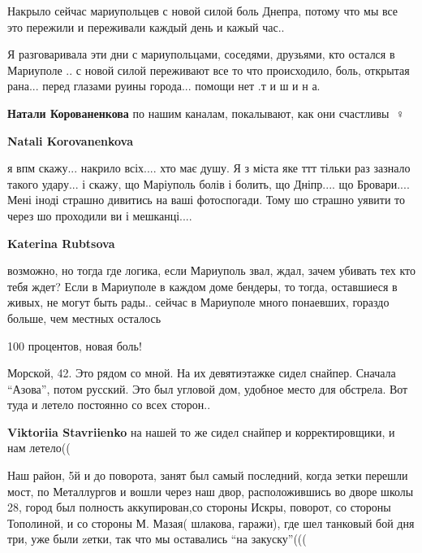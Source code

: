
Накрыло сейчас мариупольцев с новой силой боль Днепра, потому что мы все это
пережили и переживали каждый день и кажый час..

Я разговаривала эти дни с мариупольцами, соседями, друзьями, кто остался в
Мариуполе .. с новой силой переживают все то что происходило, боль, открытая
рана... перед глазами руины города... помощи нет .т и ш и н а.

\begin{itemize} %
\textbf{Натали Корованенкова} по нашим каналам, покалывают, как они счастливы 🤦♀️

\textbf{Natali Korovanenkova} 

я впм скажу... накрило всіх.... хто має душу. Я з міста яке ттт тільки раз зазнало
такого удару... і скажу, що Маріуполь болів і болить, що Дніпр.... що
Бровари.... Мені іноді страшно дивитись на ваші фотоспогади. Тому шо страшно
уявити то через шо проходили ви і мешканці....

\textbf{Katerina Rubtsova} 

возможно, но тогда где логика, если Мариуполь звал, ждал, зачем убивать тех кто
тебя ждет? Если в Мариуполе в каждом доме бендеры, то тогда, оставшиеся в
живых, не могут быть рады.. сейчас в Мариуполе много понаевших, гораздо
больше, чем местных осталось

\end{itemize} %


100 процентов, новая боль!


Морской, 42. Это рядом со мной. На их девятиэтажке сидел снайпер. Сначала
\enquote{Азова}, потом русский. Это был угловой дом, удобное место для обстрела. Вот
туда и летело постоянно со всех сторон..

\begin{itemize} %
\textbf{Viktoriia Stavriienko} на нашей то же сидел снайпер и корректировщики, и нам летело((
\end{itemize} %


Наш район, 5й и до поворота, занят был самый последний, когда зетки перешли
мост, по Металлургов и вошли через наш двор, расположившись во дворе школы 28,
город был полность аккупирован,со стороны Искры, поворот, со стороны Тополиной, и
со стороны М. Мазая( шлакова, гаражи), где шел танковый бой дня три, уже были
zетки, так что мы оставались \enquote{на закуску}(((

